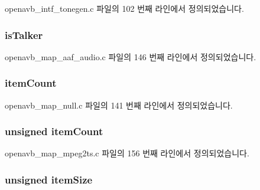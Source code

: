 openavb\+\_\+intf\+\_\+tonegen.\+c 파일의 102 번째 라인에서 정의되었습니다.

\subsubsection[{\texorpdfstring{is\+Talker}{isTalker}}]{ is\+Talker}\hypertarget{structpvt__data__t_a8de147c7de1f14e247981efec57e77a4}{}\label{structpvt__data__t_a8de147c7de1f14e247981efec57e77a4}


openavb\+\_\+map\+\_\+aaf\+\_\+audio.\+c 파일의 146 번째 라인에서 정의되었습니다.

\subsubsection[{\texorpdfstring{item\+Count}{itemCount}}]{ item\+Count}\hypertarget{structpvt__data__t_ad3640734bb9fadb7e6a9e529417638f7}{}\label{structpvt__data__t_ad3640734bb9fadb7e6a9e529417638f7}


openavb\+\_\+map\+\_\+null.\+c 파일의 141 번째 라인에서 정의되었습니다.

\subsubsection[{\texorpdfstring{item\+Count}{itemCount}}]{\setlength{\rightskip}{0pt plus 5cm}unsigned item\+Count}\hypertarget{structpvt__data__t_ab966e984215733eae3e8b7f637106513}{}\label{structpvt__data__t_ab966e984215733eae3e8b7f637106513}


openavb\+\_\+map\+\_\+mpeg2ts.\+c 파일의 156 번째 라인에서 정의되었습니다.

\subsubsection[{\texorpdfstring{item\+Size}{itemSize}}]{\setlength{\rightskip}{0pt plus 5cm}unsigned item\+Size}\hypertarget{structpvt__data__t_aad3cd018522c7d05ee74425ab1d3ad72}{}\label{structpvt__data__t_aad3cd018522c7d05ee74425ab1d3ad72}


